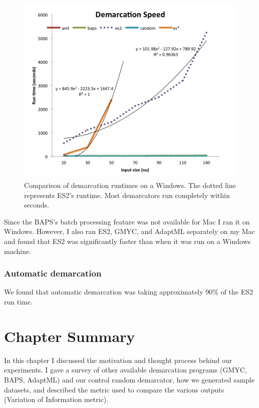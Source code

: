 \begin{figure}[h!]
  \centering
    \includegraphics[scale=0.7]{images/SpeedWindows-CH4}
      \caption[Demarcation run time test on Windows.]{Comparison of demarcation runtimes on a Windows. The dotted line represents ES2's runtime. Most demarcators run completely within seconds.}
    \label{fig:WindowsSpeed}
\end{figure}

Since the BAPS's batch processing feature was not available for Mac I ran it on Windows.
However, I also ran ES2, GMYC, and AdaptML separately on my Mac and found that ES2 was significantly faster than when it was run on a Windows machine.

\subsubsection*{Automatic demarcation}
We found that automatic demarcation was taking approximately 90\% of the ES2 run time.

\section{Chapter Summary}
In this chapter I discussed the motivation and thought process behind our experiments.
I gave a survey of other available demarcation programs (GMYC, BAPS, AdaptML) and our control random demarcator, how we generated sample datasets, and described the metric used to compare the various outputs (Variation of Information metric).

